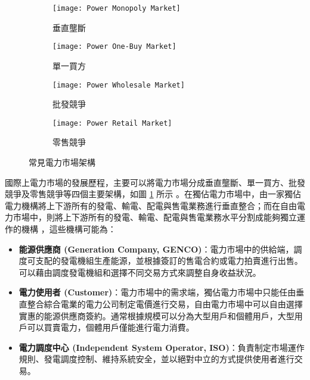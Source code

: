 \begin{figure}
  \centering
  \begin{subfigure}[b]{0.475\textwidth}
    \centering
    \texttt{[image: Power Monopoly Market]}
    \caption[垂直壟斷]{垂直壟斷}
  \end{subfigure}
  \hfill
  \begin{subfigure}[b]{0.475\textwidth}
    \centering
    \texttt{[image: Power One-Buy Market]}
    \caption[單一買方]{單一買方}
  \end{subfigure}
  \hfill
  \begin{subfigure}[c]{0.475\textwidth}
    \centering
    \texttt{[image: Power Wholesale Market]}
    \caption[批發競爭]{批發競爭}
  \end{subfigure}
  \hfill
  \begin{subfigure}[d]{0.475\textwidth}
    \centering
    \texttt{[image: Power Retail Market]}
    \caption[零售競爭]{零售競爭}
  \end{subfigure}
  \hfill
  \caption[常見電力市場架構]{常見電力市場架構}
  \label{figure: Power Markets}
\end{figure}

國際上電力市場的發展歷程，主要可以將電力市場分成垂直壟斷、單一買方、批發競爭及零售競爭等四個主要架構，如圖 \ref{figure: Power Markets} 所示 \cite{wang2015powermarket}。在獨佔電力市場中，由一家獨佔電力機構將上下游所有的發電、輸電、配電與售電業務進行垂直整合；而在自由電力市場中，則將上下游所有的發電、輸電、配電與售電業務水平分割成能夠獨立運作的機構 \cite{shahidehpour2003market}，這些機構可能為：

\begin{itemize}
  \item \textbf{能源供應商 (Generation Company, GENCO)}：電力市場中的供給端，調度可支配的發電機組生產能源，並根據簽訂的售電合約或電力拍賣進行出售。可以藉由調度發電機組和選擇不同交易方式來調整自身收益狀況。
  \item \textbf{電力使用者 (Customer)}：電力市場中的需求端，獨佔電力市場中只能任由垂直整合綜合電業的電力公司制定電價進行交易，自由電力市場中可以自由選擇實惠的能源供應商簽約。通常根據規模可以分為大型用戶和個體用戶，大型用戶可以買賣電力，個體用戶僅能進行電力消費。
  \item \textbf{電力調度中心 (Independent System Operator, ISO)}：負責制定市場運作規則、發電調度控制、維持系統安全，並以絕對中立的方式提供使用者進行交易。
\end{itemize}

